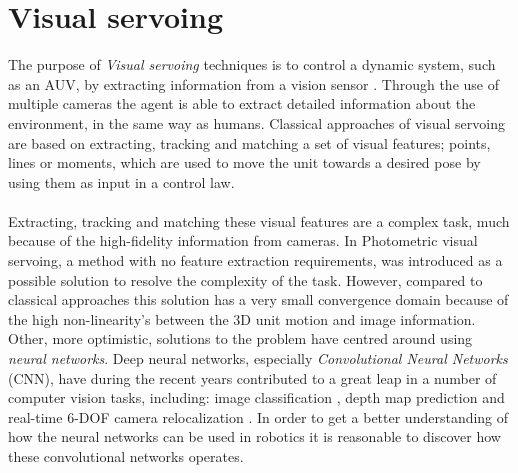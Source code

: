 \section{Visual servoing}
The purpose of \textit{Visual servoing} techniques is to control a dynamic system, such as an AUV, by extracting information from a vision sensor \cite{Quentin}. Through the use of multiple cameras the agent is able to extract detailed information about the environment, in the same way as humans. Classical approaches of visual servoing are based on extracting, tracking and matching a set of visual features; points, lines or moments, which are used to move the unit towards a desired pose by using them as input in a control law. \\\\
Extracting, tracking and matching these visual features are a complex task, much because of the high-fidelity information from cameras. In \cite{Collewet} Photometric visual servoing, a method with no feature extraction requirements, was introduced as a possible solution to resolve the complexity of the task. However, compared to classical approaches this solution has a very small convergence domain because of the high non-linearity's between the 3D unit motion and image information. Other, more optimistic, solutions to the problem have centred around using \textit{neural networks}. Deep neural networks, especially \textit{Convolutional Neural Networks} (CNN), have during the recent years contributed to a great leap in a number of computer vision tasks, including: image classification \cite{Hinton}, depth map prediction \cite{Eigen} and real-time 6-DOF camera relocalization \cite{Kendall}. In order to get a better understanding of how the neural networks can be used in robotics it is reasonable to discover how these convolutional networks operates. 
